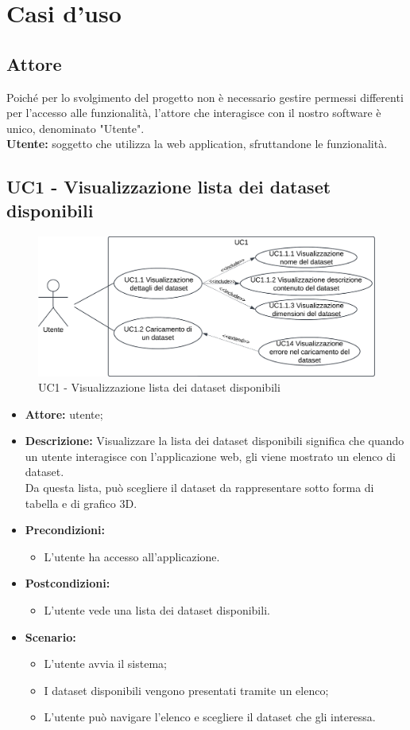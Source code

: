 \section{Casi d'uso}
\subsection{Attore}
Poiché per lo svolgimento del progetto non è necessario gestire permessi differenti per l'accesso alle funzionalità, l'attore che interagisce con il nostro software è unico, denominato "Utente".\\
\textbf{Utente:} soggetto che utilizza la web application, sfruttandone le funzionalità.
\subsection{UC1 - Visualizzazione lista dei dataset disponibili}
\begin{figure}[h!]
    \centering
    \includegraphics[scale=0.7]{template/images/UC1.png}
    \caption{UC1 - Visualizzazione lista dei dataset disponibili}
\end{figure}
\begin{itemize}
    \item \textbf{Attore:} utente;
    \item \textbf{Descrizione:} Visualizzare la lista dei dataset disponibili significa che quando un utente interagisce con l'applicazione web,
    gli viene mostrato un elenco di dataset.\\ Da questa lista, può scegliere il dataset da rappresentare sotto forma di tabella e di grafico 3D.
    \item \textbf{Precondizioni:}
    \begin{itemize}
        \item L'utente ha accesso all'applicazione.
    \end{itemize}
    \item \textbf{Postcondizioni:}
    \begin{itemize}
        \item L'utente vede una lista dei dataset disponibili.
    \end{itemize}
    \item \textbf{Scenario:} 
    \begin{itemize}
        \item L'utente avvia il sistema;
        \item I dataset disponibili vengono presentati tramite un elenco;
        \item L'utente può navigare l'elenco e scegliere il dataset che gli interessa.
    \end{itemize}
\end{itemize}
\newpage
